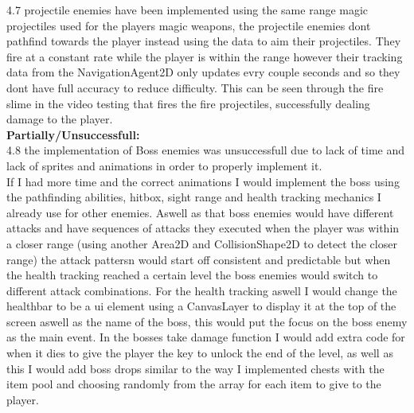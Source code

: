 \documentclass{article}
\begin{document}
        4.7 projectile enemies have been implemented using the same range magic projectiles used for the players magic weapons, the projectile enemies dont pathfind towards the player instead using the data to aim their projectiles. They fire at a constant rate while the player is within the range however their tracking data from the NavigationAgent2D only updates evry couple seconds and so they dont have full accuracy to reduce difficulty. This can be seen through the fire slime in the video testing that fires the fire projectiles, successfully dealing damage to the player.\\
        \textbf{Partially/Unsuccessfull:}\\
        4.8 the implementation of Boss enemies was unsuccessfull due to lack of time and lack of sprites and animations in order to properly implement it.\\
        If I had more time and the correct animations I would implement the boss using the pathfinding abilities, hitbox, sight range and health tracking mechanics I already use for other enemies. Aswell as that boss enemies would have different attacks and have sequences of attacks they executed when the player was within a closer range (using another Area2D and CollisionShape2D to detect the closer range) the attack pattersn would start off consistent and predictable but when the health tracking reached a certain level the boss enemies would switch to different attack combinations. For the health tracking aswell I would change the healthbar to be a ui element using a CanvasLayer to display it at the top of the screen aswell as the name of the boss, this would put the focus on the boss enemy as the main event. In the bosses take damage function I would add extra code for when it dies to give the player the key to unlock the end of the level, as well as this I would add boss drops similar to the way I implemented chests with the item pool and choosing randomly from the array for each item to give to the player.\\
\end{document}
